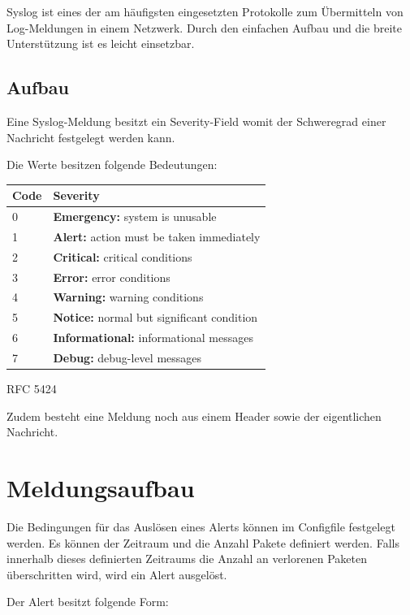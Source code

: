 \noindent Syslog ist eines der am häufigsten eingesetzten Protokolle zum Übermitteln von Log-Meldungen in einem Netzwerk. Durch den einfachen Aufbau und die breite Unterstützung ist es leicht einsetzbar.


\subsection{ Aufbau}

\noindent Eine Syslog-Meldung besitzt ein Severity-Field womit der Schweregrad einer Nachricht festgelegt werden kann.

\noindent Die Werte besitzen folgende Bedeutungen:

\begin{tabular}{|p{0.5in}|p{3.7in}|} \hline 
Code & \textbf{Severity} \\ \hline 
0 & \textbf{Emergency:} system is unusable \\ \hline 
1 & \textbf{Alert:} action must be taken immediately \\ \hline 
2 & \textbf{Critical:} critical conditions \\ \hline 
3 & \textbf{Error:} error conditions \\ \hline 
4 & \textbf{Warning:} warning conditions \\ \hline 
5 & \textbf{Notice:} normal but significant condition \\ \hline 
6 & \textbf{Informational:} informational messages \\ \hline 
7 & \textbf{Debug:} debug-level messages \\ \hline 
\end{tabular}

RFC 5424

\noindent Zudem besteht eine Meldung noch aus einem Header sowie der eigentlichen Nachricht.

\noindent 


\section{ Meldungsaufbau}

\noindent Die Bedingungen für das Auslösen eines Alerts können im Configfile festgelegt werden. Es können der Zeitraum und die Anzahl Pakete definiert werden. Falls innerhalb dieses definierten Zeitraums die Anzahl an verlorenen Paketen überschritten wird, wird ein Alert ausgelöst.

\noindent Der Alert besitzt folgende Form:

